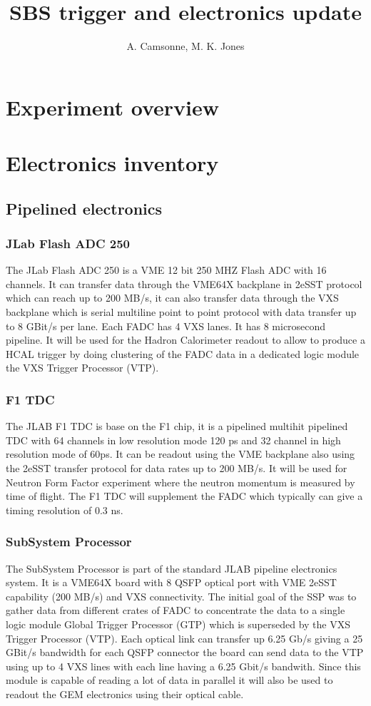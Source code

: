 \documentclass{article}
\title{SBS trigger and electronics update}
\author{A. Camsonne, M. K. Jones}
\begin{document}
\maketitle
\section{Experiment overview}

\section{Electronics inventory}

\subsection{Pipelined electronics}
\subsubsection{JLab Flash ADC 250}
The JLab Flash ADC 250 is a VME 12 bit 250 MHZ Flash ADC with 16 channels. It can transfer data through the VME64X backplane in 2eSST protocol which can reach up to 200 MB/s, it can also transfer data through the VXS backplane which is serial multiline point to point protocol with data transfer up to 8 GBit/s per lane. Each FADC has 4 VXS lanes. It has 8 microsecond pipeline. It will be used for the Hadron Calorimeter readout to allow to produce a HCAL trigger by doing clustering of the FADC data in a dedicated logic module the VXS Trigger Processor (VTP).  
\subsubsection{F1 TDC}
The JLAB F1 TDC is base on the F1 chip, it is a pipelined multihit pipelined TDC with 64 channels in low resolution mode 120 ps and 32 channel in high resolution mode of 60ps. It can be readout using the VME backplane also using the 2eSST transfer protocol for data rates up to 200 MB/s. It will be used for Neutron Form Factor experiment where the neutron momentum is measured by time of flight. The F1 TDC will supplement the FADC which typically can give a timing resolution of 0.3 ns.
\subsubsection{SubSystem Processor}
The SubSystem Processor is part of the standard JLAB pipeline electronics system. It is a VME64X board with 8 QSFP optical port with VME 2eSST capability (200 MB/s) and VXS connectivity.
The initial goal of the SSP was to gather data from different crates of FADC to concentrate the data to a single logic module Global Trigger Processor (GTP) which is superseded by the VXS Trigger Processor (VTP). Each optical link can transfer up 6.25 Gb/s giving a 25 GBit/s bandwidth for each QSFP connector the board can send data to the VTP using up to 4 VXS lines with each line having a 6.25 Gbit/s bandwith.
Since this module is capable of reading a lot of data in parallel it will also be used to readout the GEM electronics using their optical cable.
\end{document}
